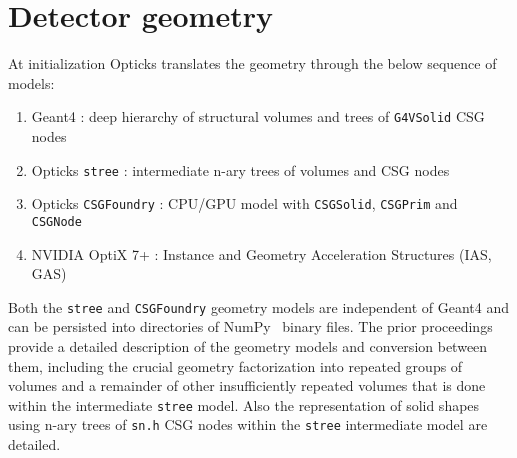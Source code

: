 \documentclass{webofc}
\begin{document}
\section{Detector geometry} 
\label{secgeom}%
At initialization Opticks translates the geometry through the below sequence of models:
%
\begin{enumerate}
\item Geant4 : deep hierarchy of structural volumes and trees of {\tt G4VSolid} CSG nodes
\item Opticks {\tt stree} : intermediate n-ary trees of volumes and CSG nodes
\item Opticks {\tt CSGFoundry} : CPU/GPU model with {\tt CSGSolid}, {\tt CSGPrim} and {\tt CSGNode} 
\item NVIDIA OptiX 7+ : Instance and Geometry Acceleration Structures (IAS, GAS)
\end{enumerate}  
%
%
Both the {\tt stree} and {\tt CSGFoundry} geometry models are independent of Geant4 and can be persisted into directories of NumPy~\cite{numpy} binary files. 
The prior proceedings~\cite{chep2023} provide a detailed description of the geometry models and conversion between them,
including the crucial geometry factorization into repeated groups of volumes and a remainder of 
other insufficiently repeated volumes that is done within the intermediate {\tt stree} model.
Also the representation of solid shapes using n-ary trees of {\tt sn.h} CSG nodes within  
the {\tt stree} intermediate model are detailed. 
%
%
%
\end{document}
